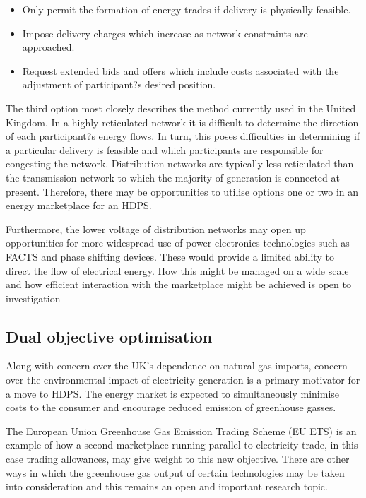 \begin{itemize}
  \item Only permit the formation of energy trades if delivery is physically
  feasible.
  \item Impose delivery charges which increase as network constraints are
   approached.
  \item Request extended bids and offers which include costs associated with
  the adjustment of participant?s desired position.
\end{itemize}

The third option most closely describes the method currently used in the United
Kingdom.  In a highly reticulated network it is difficult to determine the
direction of each participant?s energy flows.  In turn, this poses
difficulties in determining if a particular delivery is feasible and which
participants are responsible for congesting the network.  Distribution
networks are typically less reticulated than the transmission network to which
the majority of generation is connected at present.  Therefore, there may be
opportunities to utilise options one or two in an energy marketplace for an
HDPS.

Furthermore, the lower voltage of distribution networks may open up
opportunities for more widespread use of power electronics technologies such
as FACTS and phase shifting devices.  These would provide a limited ability to
direct the flow of electrical energy.  How this might be managed on a wide
scale and how efficient interaction with the marketplace might be achieved is
open to investigation

\subsection{Dual objective optimisation}
Along with concern over the UK's dependence on natural gas imports, concern
over the environmental impact of electricity generation is a primary motivator
for a move to HDPS.  The energy market is expected to simultaneously minimise
costs to the consumer and encourage reduced emission of greenhouse gasses.

The European Union Greenhouse Gas Emission Trading Scheme (EU ETS) is an
example of how a second marketplace running parallel to electricity trade, in
this case trading allowances, may give weight to this new objective.  There
are other ways in which the greenhouse gas output of certain technologies may
be taken into consideration and this remains an open and important research
topic.
